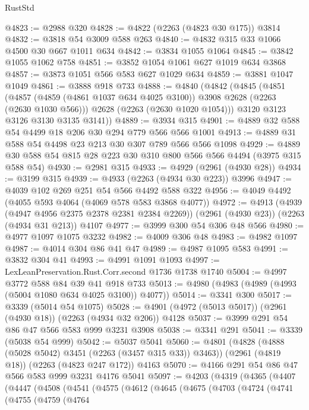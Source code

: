 \begin{lexlean}{RustStd}
\begin{coremodule}
@4823 := @2988 @320
@4828 := @4822 (@2263 (@4823 @30 @175)) @3814
@4832 := @3818 @54 @3009 @588 @263
@4840 := @4832 @315 @33 @1066 @4500 @30 @667 @1011 @634
@4842 := @3834 @1055 @1064
@4845 := @3842 @1055 @1062 @758
@4851 := @3852 @1054 @1061 @627 @1019 @634 @3868
@4857 := @3873 @1051 @566 @583 @627 @1029 @634
@4859 := @3881 @1047 @1049
@4861 := @3888 @918 @733
@4888 := @4840
    (@4842
      (@4845
        (@4851
          (@4857 (@4859 (@4861 @1037 @634 @4025 @3100)) @3908 @2628 (@2263 (@2630 @1030 @566)))
          @2628
          (@2263 (@2630 @1020 @1054)))
        @3120
        @3123
        @3126
        @3130
        @3135
        @3141))
@4889 := @3934 @315
@4901 := @4889 @32 @588 @54 @4499 @18 @206 @30 @294 @779 @566 @566 @1001
@4913 := @4889 @31 @588 @54 @4498 @23 @213 @30 @307 @789 @566 @566 @1098
@4929 := @4889 @30 @588 @54 @815 @28 @223 @30 @310 @800 @566 @566 @4494 (@3975 @315 @588 @54)
@4930 := @2981 @315
@4933 := @4929 (@2961 (@4930 @28))
@4934 := @3199 @315
@4939 := @4933 (@2263 (@4934 @30 @223)) @3996
@4947 := @4039 @102 @269 @251 @54 @566 @4492 @588 @322
@4956 := @4049 @4492 (@4055 @593 @4064 (@4069 @578 @583 @3868 @4077))
@4972 := @4913
    (@4939 (@4947 @4956 @2375 @2378 @2381 @2384 @2269))
    (@2961 (@4930 @23))
    (@2263 (@4934 @31 @213))
    @4107
@4977 := @3999 @300 @54 @306 @48 @566
@4980 := @4977 @1097 @1075 @3232
@4982 := @4009 @306 @48
@4983 := @4982 @1097
@4987 := @4014 @304 @86 @41 @47
@4989 := @4987 @1095 @583
@4991 := @3832 @304 @41
@4993 := @4991 @1091 @1093
@4997 := LexLeanPreservation.Rust.Corr.second @1736 @1738 @1740
@5004 := @4997 @3772 @588 @84 @39 @41 @918 @733
@5013 := @4980 (@4983 (@4989 (@4993 (@5004 @1080 @634 @4025 @3100)) @4077))
@5014 := @3341 @300
@5017 := @3339 (@5014 @54 @1075)
@5028 := @4901 (@4972 (@5013 @5017)) (@2961 (@4930 @18)) (@2263 (@4934 @32 @206)) @4128
@5037 := @3999 @291 @54 @86 @47 @566 @583 @999 @3231 @3908
@5038 := @3341 @291
@5041 := @3339 (@5038 @54 @999)
@5042 := @5037 @5041
@5060 := @4801
    (@4828 (@4888 (@5028 @5042) @3451 (@2263 (@3457 @315 @33)) @3463))
    (@2961 (@4819 @18))
    (@2263 (@4823 @247 @172))
    @4163
@5070 := @4166 @291 @54 @86 @47 @566 @583 @999 @3231 @4176 @5041
@5097 := @4203
    (@4319
      (@4365
        (@4407
          (@4447
            (@4508
              (@4541
                (@4575
                  (@4612
                    (@4645
                      (@4675
                        (@4703
                          (@4724
                            (@4741
                              (@4755
                                (@4759
                                  (@4764

\end{coremodule}
\end{lexlean}
